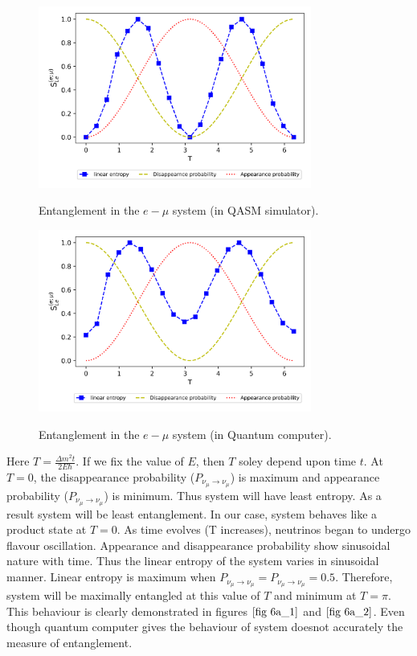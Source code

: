 \documentclass[12pt,a4paper]{report}
\begin{document}
\begin{figure}[H]
	\graphicspath{ {./Images/} }
	\centering	
	{\includegraphics[width=0.8\textwidth]{fig_6a_1.png}}
	\caption{Entanglement in the $e-\mu$ system (in QASM simulator).}
	\label{fig 6a_1}
\end{figure}
\begin{figure}[H]
	\graphicspath{ {./Images/} }
	\centering	
	{\includegraphics[width=0.8\textwidth]{fig_6a_2.png}}
	\caption{Entanglement in the $e-\mu$ system (in Quantum computer).}
	\label{fig 6a_2}
\end{figure}
Here $T=\frac{\Delta m^{2}t}{2E\hbar}$. If we fix the value of $E$, then $T$ soley depend upon time $t$. At $T=0$, the disappearance probability ($P_{\nu_{\mu}\rightarrow\nu_{\mu}}$) is maximum and appearance probability ($P_{\nu_{\mu}\rightarrow\nu_{\mu}}$) is minimum. Thus system will have least entropy. As a result system will be least entanglement. In our case, system behaves like a product state at $T=0$. As time evolves (T increases), neutrinos began to undergo flavour oscillation. Appearance and disappearance probability show sinusoidal nature with time. Thus the linear entropy of the system varies in sinusoidal manner. Linear entropy is maximum when $P_{\nu_{\mu}\rightarrow\nu_{\mu}}=P_{\nu_{\mu}\rightarrow\nu_{\mu}}=0.5$. Therefore, system will be maximally entangled at this value of $T$ and minimum at $T=\pi$. This behaviour is clearly demonstrated in figures $\ref{fig 6a_1}$ and $\ref{fig 6a_2}$. Even though quantum computer gives the behaviour of system doesnot accurately the measure of entanglement.
\end{document}
